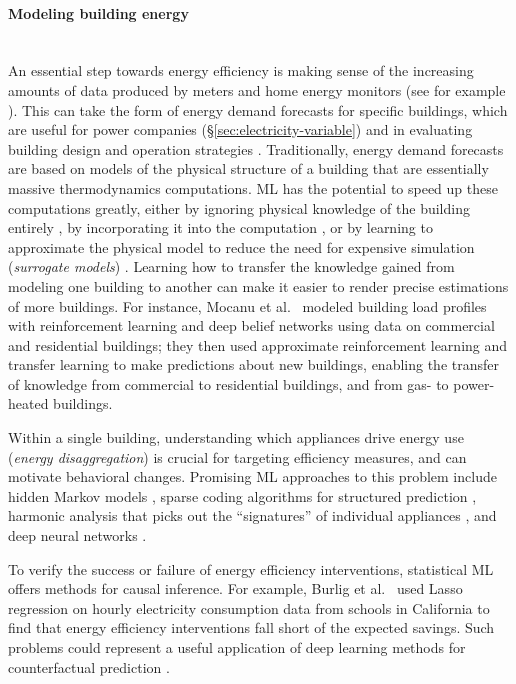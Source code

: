 \documentclass[11pt]{report}
\newcommand{\et}{et al.~}
\begin{document}
\paragraph{Modeling building energy}\mbox{}\\\label{sec:use}An essential step towards energy efficiency is making sense of the increasing amounts of data produced by meters and home energy monitors (see for example \cite{sense}). This can take the form of energy demand forecasts for specific buildings, which are useful for power companies (\S\ref{sec:electricity-variable}) and in evaluating building design and operation strategies \cite{AMASYALI20181192}. Traditionally, energy demand forecasts are based on models of the physical structure of a building that are essentially massive thermodynamics computations. ML has the potential to speed up these computations greatly, either by ignoring physical knowledge of the building entirely \cite{kreider1995building,paterakis2017deep}, by incorporating it into the computation \cite{dong2016hybrid}, or by learning to approximate the physical model to reduce the need for expensive simulation (\emph{surrogate models}) \cite{VANGELDER2014245}. Learning how to transfer the knowledge gained from modeling one building to another can make it easier to render precise estimations of more buildings. For instance, Mocanu \et \cite{mocanu_unsupervised_2016} modeled building load profiles with reinforcement learning and deep belief networks using data on commercial and residential buildings; they then used approximate reinforcement learning and transfer learning to make predictions about new buildings, enabling the transfer of knowledge from commercial to residential buildings, and from gas- to power-heated buildings.

Within a single building, understanding which appliances drive energy use (\emph{energy disaggregation}) is crucial for targeting efficiency measures, and can motivate behavioral changes. Promising ML approaches to this problem include hidden Markov models \cite{kolter2012approximate}, sparse  coding  algorithms for structured prediction
\cite{kolter2010energy}, harmonic analysis that picks out the ``signatures'' of individual appliances \cite{Srinivasan2006neural}, and deep neural networks \cite{Kelly:2015:NND:2821650.2821672}.

To verify the success or failure of energy efficiency interventions, statistical ML offers methods for causal inference. For example, Burlig \et \cite{burlig2017machine} used Lasso regression on hourly electricity consumption data from schools in California to find that energy efficiency interventions fall short of the expected savings. Such problems could represent a useful application of deep learning methods for counterfactual prediction \cite{hartford2017deep}.
\end{document}
